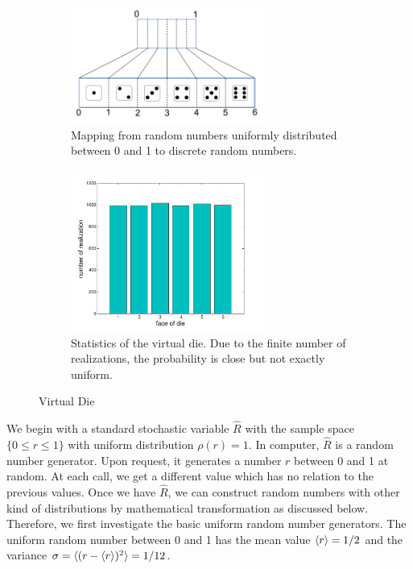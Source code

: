 \begin{figure}
	\centering
	\begin{subfigure}{0.45\textwidth}
		\centering
		\includegraphics[width=2.5in]{15.Random-Numbers/map2die.pdf}
		\caption{Mapping from random numbers uniformly distributed between 0 and 1 to discrete random numbers.}
		\label{fig:map2die}
	\end{subfigure}
	\begin{subfigure}{0.45\textwidth}
		\centering
		\includegraphics[width=2.5in]{15.Random-Numbers/virtual_die.pdf}
\caption{Statistics of the virtual die.  Due to the finite number of realizations, the probability is close but not exactly uniform.}
\label{fig:die_stat}
	\end{subfigure}
\caption{Virtual Die}\label{fig:virtual_die}
\end{figure}

We begin with a standard stochastic variable $\hat{R}$ with the sample space $\{ 0 \le r \le 1\}$ with uniform distribution $\rho(r)=1$. In computer, $\hat{R}$ is a random number generator.  Upon request, it generates a number $r$ between 0 and 1 at random.  At each call, we get a different value which has no relation to the previous values. Once we have $\hat{R}$,
we can construct random numbers with other kind of distributions by mathematical transformation as discussed below.  Therefore, we first investigate the basic uniform random number generators.  The uniform random number between 0 and 1 has the mean value $\langle r \rangle=1/2$ and the variance $\sigma=\langle (r-\langle r \rangle)^2 \rangle=1/12$.

